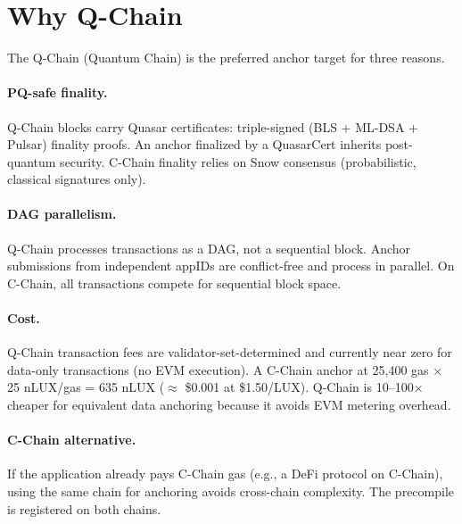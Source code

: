 \section{Why Q-Chain}

\label{sec:qchain}

The Q-Chain (Quantum Chain) is the preferred anchor target for three reasons.

\paragraph{PQ-safe finality.}
Q-Chain blocks carry Quasar certificates: triple-signed (BLS + ML-DSA +
Pulsar) finality proofs. An anchor finalized by a QuasarCert inherits
post-quantum security. C-Chain finality relies on Snow consensus
(probabilistic, classical signatures only).

\paragraph{DAG parallelism.}
Q-Chain processes transactions as a DAG, not a sequential block. Anchor
submissions from independent appIDs are conflict-free and process in
parallel. On C-Chain, all transactions compete for sequential block space.

\paragraph{Cost.}
Q-Chain transaction fees are validator-set-determined and currently near
zero for data-only transactions (no EVM execution). A C-Chain anchor at
25,400 gas $\times$ 25 nLUX/gas = 635 nLUX ($\approx$ \$0.001 at
\$1.50/LUX). Q-Chain is 10--100$\times$ cheaper for equivalent data
anchoring because it avoids EVM metering overhead.

\paragraph{C-Chain alternative.}
If the application already pays C-Chain gas (e.g., a DeFi protocol on
C-Chain), using the same chain for anchoring avoids cross-chain
complexity. The precompile is registered on both chains.

